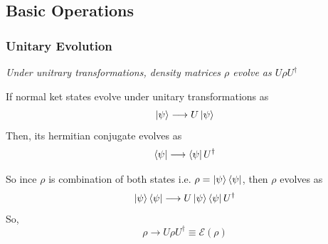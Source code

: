 \documentclass{article}
\begin{document}
\subsection{Basic Operations}
\subsubsection{Unitary Evolution}
\textit{Under unitrary transformations, density matrices \(\rho\)
evolve as \(U\rho U^{\dagger}\)}

If normal ket states evolve under unitary transformations as
\[\ket{\psi} \longrightarrow U\ket{\psi}\]
Then, its hermitian conjugate evolves as
\[\bra{\psi} \longrightarrow \bra{\psi}U^{\dagger}\]


So ince \(\rho\) is combination of both states i.e. \(\rho = \ket{\psi}\bra{\psi}\), then \(\rho\) evolves as
\[\ket{\psi}\bra{\psi} \longrightarrow U\ket{\psi}\bra{\psi}U^{\dagger} \]
So,
\[\rho \longrightarrow U\rho U^{\dagger} \equiv \mathcal{E}(\rho) \]
\end{document}
